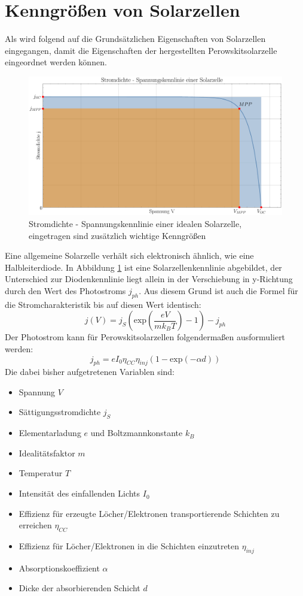 \documentclass[12pt,a4paper,ngerman]{report}
\begin{document}
	\section{Kenngrößen von Solarzellen}
	Als wird folgend auf die Grundsätzlichen Eigenschaften von Solarzellen eingegangen, damit die Eigenschaften der hergestellten Perowskitsolarzelle eingeordnet werden können.\\
	\begin{figure}[ht]
		\centering
		\includegraphics[width=\textwidth]{Bilder/SolarzelleIdeal.pdf}		
		\caption[Kennlinie ideale Solarzelle]{Stromdichte - Spannungskennlinie einer idealen Solarzelle, eingetragen sind zusätzlich wichtige Kenngrößen}
		\label{img:SolarzelleIdeal}
	\end{figure}
	Eine allgemeine Solarzelle verhält sich elektronisch ähnlich, wie eine Halbleiterdiode. In Abbildung \ref{img:SolarzelleIdeal} ist eine Solarzellenkennlinie abgebildet, der Unterschied zur Diodenkennlinie liegt allein in der Verschiebung in y-Richtung durch den Wert des Photostroms $j_{ph}$. Aus diesem Grund ist auch die Formel für die Stromcharakteristik bis auf diesen Wert identisch:
	\begin{equation}\label{eq:kennlinie}
		j(V) =  j_S \left(\text{exp}\left(\frac{e V}{m k_B T}\right) - 1\right) - j_{ph}
	\end{equation} 
	Der Photostrom kann für Perowskitsolarzellen folgendermaßen ausformuliert werden:
	\begin{equation}
		j_{ph} = e I_0 \eta_{CC} \eta_{inj} (1-\text{exp}(-\alpha d))
	\end{equation}
	Die dabei bisher aufgetretenen Variablen sind:
	\begin{itemize}
		\item Spannung $V$
		\item Sättigungsstromdichte $j_S$
		\item Elementarladung $e$ und Boltzmannkonstante $k_B$
		\item Idealitätsfaktor $m$
		\item Temperatur $T$
		\item Intensität des einfallenden Lichts $I_0$
		\item Effizienz für erzeugte Löcher/Elektronen transportierende Schichten zu erreichen $\eta_{CC}$
		\item Effizienz für Löcher/Elektronen in die Schichten einzutreten $\eta_{inj}$
		\item Absorptionskoeffizient $\alpha$
		\item Dicke der absorbierenden Schicht $d$
	\end{itemize}
\end{document}
